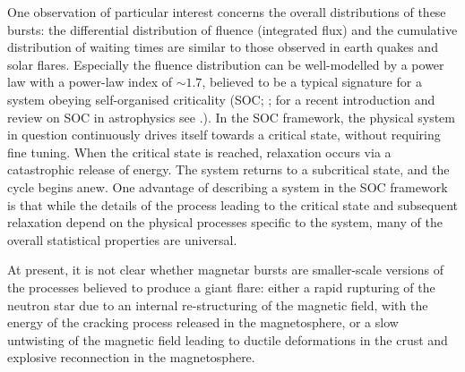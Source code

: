 \documentclass[12pt]{emulateapj}
\begin{document}
One observation of particular interest concerns the overall distributions of these bursts: the differential distribution of fluence (integrated flux) and 
the cumulative distribution of waiting times are similar to those observed in earth quakes and solar flares\citep{cheng1996}. Especially the fluence distribution
can be well-modelled by a power law with a power-law index of $\sim 1.7$, believed to be a typical signature for a system obeying 
self-organised criticality (SOC; \citealp{bak1987,bak1988}; for a recent introduction and review on SOC in astrophysics see \citealp{aschwanden2014}.). 
In the SOC framework, the physical system in question continuously drives itself towards a critical state,
without requiring fine tuning. When the critical state is reached, relaxation occurs via a catastrophic release of energy. The system returns
to a subcritical state, and the cycle begins anew. %
One advantage of describing a system in the SOC framework is that while the details of the process leading to the critical state and subsequent
relaxation depend on the physical processes specific to the system, many of the overall statistical properties are universal.

At present, it is not clear whether magnetar bursts are smaller-scale versions of the processes believed to produce a giant flare:
either a rapid rupturing of the neutron star due to an internal re-structuring of the magnetic field, with the energy of the cracking process
released in the magnetosphere, or a slow untwisting of the magnetic field leading to ductile deformations in the crust and explosive 
reconnection in the magnetosphere.

\end{document}
